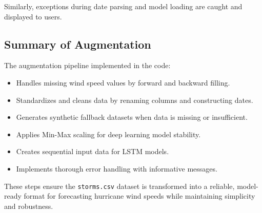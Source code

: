 Similarly, exceptions during date parsing and model loading are caught and displayed to users.

\subsection{Summary of Augmentation}

The augmentation pipeline implemented in the code:

\begin{itemize}
	\item Handles missing wind speed values by forward and backward filling.
	\item Standardizes and cleans data by renaming columns and constructing dates.
	\item Generates synthetic fallback datasets when data is missing or insufficient.
	\item Applies Min-Max scaling for deep learning model stability.
	\item Creates sequential input data for LSTM models.
	\item Implements thorough error handling with informative messages.
\end{itemize}

These steps ensure the \texttt{storms.csv} dataset is transformed into a reliable, model-ready format for forecasting hurricane wind speeds while maintaining simplicity and robustness.
